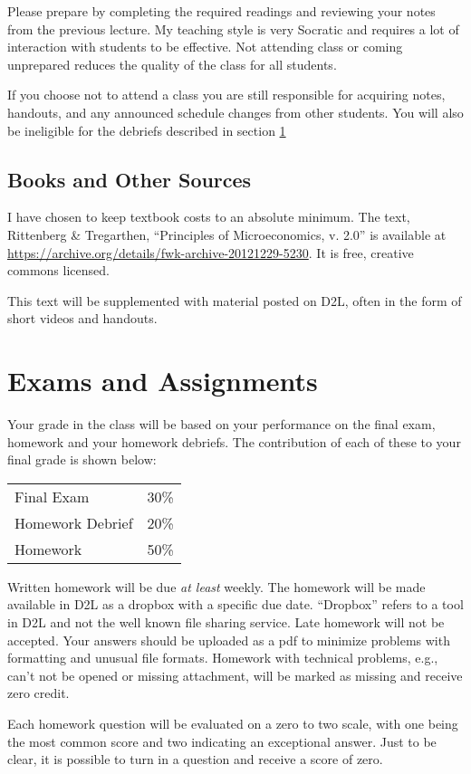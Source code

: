 \documentclass[letterpaper,10pt]{article}
\begin{document}
Please prepare by completing the required readings and reviewing your notes from the
previous lecture. My teaching style is very Socratic and requires a
lot of interaction with students to be effective. Not attending class
or coming unprepared reduces the quality of the class for all
students.

If you choose not to attend a class you are still responsible for
acquiring notes, handouts, and any announced schedule changes from
other students. You will also be ineligible for the debriefs described in section \ref{Grades}

\subsection{Books and Other Sources}
I have chosen to keep textbook costs to an absolute minimum.  The text, Rittenberg \& Tregarthen, ``Principles of Microeconomics, v. 2.0'' is available at \url{https://archive.org/details/fwk-archive-20121229-5230}.  It is free, creative commons licensed.  

This text will be supplemented with material posted on D2L, often in the form of short videos and handouts.

\section{Exams and Assignments}\label{Grades}

Your grade in the class will be based on your performance on the final
exam, homework and your homework debriefs. The contribution of each of these to your final grade is shown below:

\begin{tabular}{ll}
  Final Exam&30\%\\
  Homework Debrief&20\%\\
  Homework&50\%\\
\end{tabular} 

Written homework will be due \emph{at least} weekly.  The homework will be made available in D2L as a dropbox with a specific due date. ``Dropbox'' refers to a tool in D2L and not the well known file sharing service. 
Late homework will not be accepted.  Your answers should be uploaded as a pdf to minimize problems with formatting and unusual file formats. Homework with technical problems, e.g., can't not be opened or missing attachment, will be marked as missing and receive zero credit.

Each homework question will be evaluated on a zero to two scale, with one being the most common score and two indicating an exceptional answer.  Just to be clear, it is possible to turn in a question and receive a score of zero.
\end{document}
